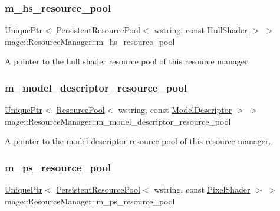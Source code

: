 \subsubsection{\texorpdfstring{m\+\_\+hs\+\_\+resource\+\_\+pool}{m\_hs\_resource\_pool}}
{\footnotesize\ttfamily \hyperlink{namespacemage_a3316d7143a973e37adf1110f2e80ca31}{Unique\+Ptr}$<$ \hyperlink{classmage_1_1_persistent_resource_pool}{Persistent\+Resource\+Pool}$<$ wstring, const \hyperlink{namespacemage_a6705043f61391313d099f89ee3cc94ee}{Hull\+Shader} $>$ $>$ mage\+::\+Resource\+Manager\+::m\+\_\+hs\+\_\+resource\+\_\+pool\hspace{0.3cm}{\ttfamily [private]}}

A pointer to the hull shader resource pool of this resource manager. \hypertarget{classmage_1_1_resource_manager_a57aab278f875724e43b48a9e9885ccea}{}\label{classmage_1_1_resource_manager_a57aab278f875724e43b48a9e9885ccea} 
\subsubsection{\texorpdfstring{m\+\_\+model\+\_\+descriptor\+\_\+resource\+\_\+pool}{m\_model\_descriptor\_resource\_pool}}
{\footnotesize\ttfamily \hyperlink{namespacemage_a3316d7143a973e37adf1110f2e80ca31}{Unique\+Ptr}$<$ \hyperlink{classmage_1_1_resource_pool}{Resource\+Pool}$<$ wstring, const \hyperlink{classmage_1_1_model_descriptor}{Model\+Descriptor} $>$ $>$ mage\+::\+Resource\+Manager\+::m\+\_\+model\+\_\+descriptor\+\_\+resource\+\_\+pool\hspace{0.3cm}{\ttfamily [private]}}

A pointer to the model descriptor resource pool of this resource manager. \hypertarget{classmage_1_1_resource_manager_ab271d7c35552e28b3b79cb10fea5cf72}{}\label{classmage_1_1_resource_manager_ab271d7c35552e28b3b79cb10fea5cf72} 
\subsubsection{\texorpdfstring{m\+\_\+ps\+\_\+resource\+\_\+pool}{m\_ps\_resource\_pool}}
{\footnotesize\ttfamily \hyperlink{namespacemage_a3316d7143a973e37adf1110f2e80ca31}{Unique\+Ptr}$<$ \hyperlink{classmage_1_1_persistent_resource_pool}{Persistent\+Resource\+Pool}$<$ wstring, const \hyperlink{namespacemage_ac98506b7edd999ea43ec46fbd0330238}{Pixel\+Shader} $>$ $>$ mage\+::\+Resource\+Manager\+::m\+\_\+ps\+\_\+resource\+\_\+pool\hspace{0.3cm}{\ttfamily [private]}}

